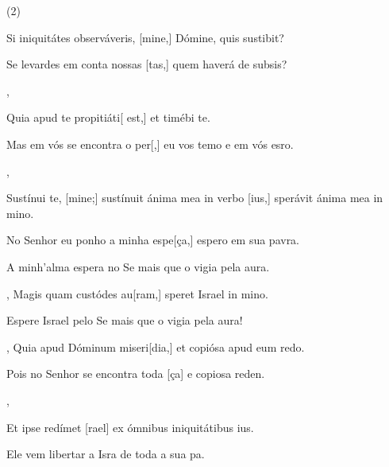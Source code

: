 \SetVersePairs(2){
  {\item {}Si iniquitátes observáveris, [mine,] Dómine, quis susti\-bit?~\Responsorium}%
    {\item {}Se levardes em conta nossas [tas,] quem haverá de subsis?~\Responsorium},
  {\item {}Quia apud te propitiáti[ est,] et timébi te.~\Responsorium}%
    {\item {}Mas em vós se encontra o per[,] eu vos temo e em vós esro.~\Responsorium},
  {\item {}Sustínui te, [mine;] sustínuit ánima mea in verbo [ius,] sperávit ánima mea in mino.~\Responsorium}%
    {\item {}No Senhor eu ponho a minha espe[ça,] espero em sua pavra.~\Responsorium
      \item {}A minh'alma espera no Se mais que o vigia pela aura.~\Responsorium},
  {Magis quam custódes au[ram,] speret Israel in mino.~\Responsorium}%
    {\item {}Espere Israel pelo Se mais que o vigia pela aura!~\Responsorium},
  {Quia apud Dóminum miseri[dia,] et copiósa apud eum redo.~\Responsorium}%
    {\item {}Pois no Senhor se encontra toda [ça] e copiosa reden.~\Responsorium},
  {\item {}Et ipse redímet [rael] ex ómnibus iniquitátibus ius.~\Responsorium}%
    {\item {}Ele vem libertar a Isra de toda a sua pa.~\Responsorium}
}
